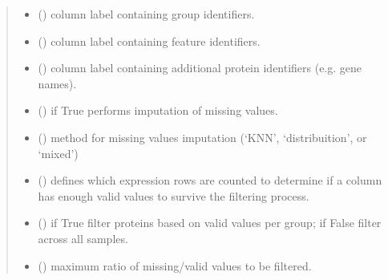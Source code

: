 \documentclass[letterpaper,10pt,english]{sphinxmanual}
\begin{document}
\begin{fulllineitems}
\begin{quote}
\begin{description}
\begin{itemize}
\item {} 
 () \textendash{} column label containing group identifiers.

\item {} 
 () \textendash{} column label containing feature identifiers.

\item {} 
 () \textendash{} column label containing additional protein identifiers (e.g. gene names).

\item {} 
 () \textendash{} if True performs imputation of missing values.

\item {} 
 () \textendash{} method for missing values imputation (‘KNN’, ‘distribuition’, or ‘mixed’)

\item {} 
 () \textendash{} defines which expression rows are counted to determine if a column has enough valid values to survive the filtering process.

\item {} 
 () \textendash{} if True filter proteins based on valid values per group; if False filter across all samples.

\item {} 
 () \textendash{} maximum ratio of missing/valid values to be filtered.


\end{itemize}
\end{description}
\end{quote}
\end{fulllineitems}
\end{document}
